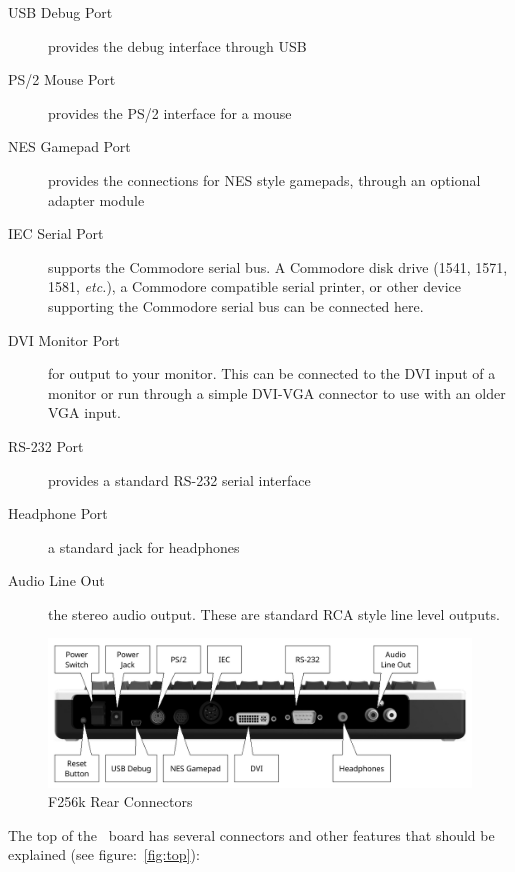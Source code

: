 \begin{description}
    \item[USB Debug Port] provides the debug interface through USB
    
    \item[PS/2 Mouse Port] provides the PS/2 interface for a mouse
    
    \item[NES Gamepad Port] provides the connections for NES style gamepads, through an optional adapter module
    
    \item[IEC Serial Port] supports the Commodore serial bus. A Commodore disk drive (1541, 1571, 1581, {\it etc.}), a Commodore compatible serial printer, or other device supporting the Commodore serial bus can be connected here.

    \item[DVI Monitor Port] for output to your monitor. This can be connected to the DVI input of a monitor or run through a simple DVI-VGA connector to use with an older VGA input.
    
    \item[RS-232 Port] provides a standard RS-232 serial interface
    
    \item[Headphone Port] a standard jack for headphones

    \item[Audio Line Out] the stereo audio output. These are standard RCA style line level outputs.
\end{description}

\begin{figure}[ht]
    \begin{center}
        \includegraphics[scale=0.75]{images/f256k_back_annotated.pdf}
    \end{center}
    \caption{F256k Rear Connectors}
    \label{fig:rear_k}
\end{figure}

The top of the \fjr\ board has several connectors and other features that should be explained (see figure:~\ref{fig:top}):

